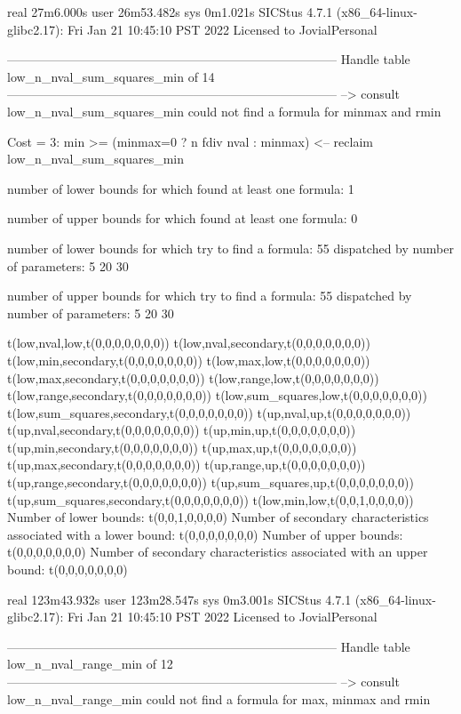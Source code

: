 real	27m6.000s
user	26m53.482s
sys	0m1.021s
SICStus 4.7.1 (x86_64-linux-glibc2.17): Fri Jan 21 10:45:10 PST 2022
Licensed to JovialPersonal


--------------------------------------------------------------------------------
Handle table low_n_nval_sum_squares_min of 14
--------------------------------------------------------------------------------
--> consult low_n_nval_sum_squares_min
could not find a formula for minmax and rmin

Cost =  3:  min >= (minmax=0 ? n fdiv nval : minmax)
<-- reclaim low_n_nval_sum_squares_min

number of lower bounds for which found at least one formula: 1

number of upper bounds for which found at least one formula: 0

number of lower bounds for which try to find a formula: 55
dispatched by number of parameters: 5  20  30

number of upper bounds for which try to find a formula: 55
dispatched by number of parameters: 5  20  30

t(low,nval,low,t(0,0,0,0,0,0,0))
t(low,nval,secondary,t(0,0,0,0,0,0,0))
t(low,min,secondary,t(0,0,0,0,0,0,0))
t(low,max,low,t(0,0,0,0,0,0,0))
t(low,max,secondary,t(0,0,0,0,0,0,0))
t(low,range,low,t(0,0,0,0,0,0,0))
t(low,range,secondary,t(0,0,0,0,0,0,0))
t(low,sum_squares,low,t(0,0,0,0,0,0,0))
t(low,sum_squares,secondary,t(0,0,0,0,0,0,0))
t(up,nval,up,t(0,0,0,0,0,0,0))
t(up,nval,secondary,t(0,0,0,0,0,0,0))
t(up,min,up,t(0,0,0,0,0,0,0))
t(up,min,secondary,t(0,0,0,0,0,0,0))
t(up,max,up,t(0,0,0,0,0,0,0))
t(up,max,secondary,t(0,0,0,0,0,0,0))
t(up,range,up,t(0,0,0,0,0,0,0))
t(up,range,secondary,t(0,0,0,0,0,0,0))
t(up,sum_squares,up,t(0,0,0,0,0,0,0))
t(up,sum_squares,secondary,t(0,0,0,0,0,0,0))
t(low,min,low,t(0,0,1,0,0,0,0))
Number of lower bounds:                                             t(0,0,1,0,0,0,0)
Number of secondary characteristics associated with a lower bound:  t(0,0,0,0,0,0,0)
Number of upper bounds:                                             t(0,0,0,0,0,0,0)
Number of secondary characteristics associated with an upper bound: t(0,0,0,0,0,0,0)

real	123m43.932s
user	123m28.547s
sys	0m3.001s
SICStus 4.7.1 (x86_64-linux-glibc2.17): Fri Jan 21 10:45:10 PST 2022
Licensed to JovialPersonal


--------------------------------------------------------------------------------
Handle table low_n_nval_range_min of 12
--------------------------------------------------------------------------------
--> consult low_n_nval_range_min
could not find a formula for max, minmax and rmin

